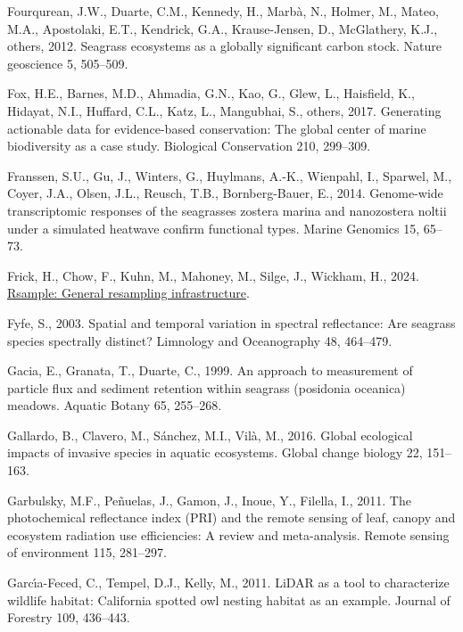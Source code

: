 \documentclass[
  letterpaper,
  11pt,
  english,
  singlespacing,
  headsepline]{MastersDoctoralThesis}
\newlength{\cslhangindent}
\newenvironment{CSLReferences}[2] %
 {\begin{list}{}{%
  \setlength{\itemindent}{0pt}
  \setlength{\leftmargin}{0pt}
  \setlength{\parsep}{0pt}
  \ifodd #1
   \setlength{\leftmargin}{\cslhangindent}
   \setlength{\itemindent}{-1\cslhangindent}
  \fi
  \setlength{\itemsep}{#2\baselineskip}}}
 {\end{list}}
\begin{document}
\begin{CSLReferences}{1}{0}
Fourqurean, J.W., Duarte, C.M., Kennedy, H., Marbà, N., Holmer, M.,
Mateo, M.A., Apostolaki, E.T., Kendrick, G.A., Krause-Jensen, D.,
McGlathery, K.J., others, 2012. Seagrass ecosystems as a globally
significant carbon stock. Nature geoscience 5, 505--509.

Fox, H.E., Barnes, M.D., Ahmadia, G.N., Kao, G., Glew, L., Haisfield,
K., Hidayat, N.I., Huffard, C.L., Katz, L., Mangubhai, S., others, 2017.
Generating actionable data for evidence-based conservation: The global
center of marine biodiversity as a case study. Biological Conservation
210, 299--309.

Franssen, S.U., Gu, J., Winters, G., Huylmans, A.-K., Wienpahl, I.,
Sparwel, M., Coyer, J.A., Olsen, J.L., Reusch, T.B., Bornberg-Bauer, E.,
2014. Genome-wide transcriptomic responses of the seagrasses zostera
marina and nanozostera noltii under a simulated heatwave confirm
functional types. Marine Genomics 15, 65--73.

Frick, H., Chow, F., Kuhn, M., Mahoney, M., Silge, J., Wickham, H.,
2024. \href{https://CRAN.R-project.org/package=rsample}{Rsample: General
resampling infrastructure}.

Fyfe, S., 2003. Spatial and temporal variation in spectral reflectance:
Are seagrass species spectrally distinct? Limnology and Oceanography 48,
464--479.

Gacia, E., Granata, T., Duarte, C., 1999. An approach to measurement of
particle flux and sediment retention within seagrass (posidonia
oceanica) meadows. Aquatic Botany 65, 255--268.

Gallardo, B., Clavero, M., Sánchez, M.I., Vilà, M., 2016. Global
ecological impacts of invasive species in aquatic ecosystems. Global
change biology 22, 151--163.

Garbulsky, M.F., Peñuelas, J., Gamon, J., Inoue, Y., Filella, I., 2011.
The photochemical reflectance index (PRI) and the remote sensing of
leaf, canopy and ecosystem radiation use efficiencies: A review and
meta-analysis. Remote sensing of environment 115, 281--297.

Garcı́a-Feced, C., Tempel, D.J., Kelly, M., 2011. LiDAR as a tool to
characterize wildlife habitat: California spotted owl nesting habitat as
an example. Journal of Forestry 109, 436--443.


\end{CSLReferences}
\end{document}

